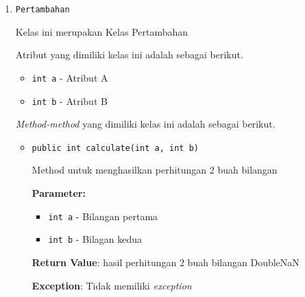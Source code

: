 \documentclass{article}
\begin{document}
\begin{enumerate}
\begin{itemize}
\end{itemize}
\item \texttt{Pertambahan}

Kelas ini merupakan Kelas Pertambahan

Atribut yang dimiliki kelas ini adalah sebagai berikut.
\begin{itemize}
\item \texttt{int a} - Atribut A
\item \texttt{int b} - Atribut B
\end{itemize}
\textit{Method-method} yang dimiliki kelas ini adalah sebagai berikut.
\begin{itemize}
\item \texttt{public int calculate(int a, int b)}

Method untuk menghasilkan perhitungan 2 buah bilangan

\textbf{Parameter:}
\begin{itemize}
\item \texttt{int a} - 
Bilangan pertama
\item \texttt{int b} - 
Bilagan kedua
\end{itemize}
\textbf{Return Value}: hasil perhitungan 2 buah bilangan  DoubleNaN

\textbf{Exception}: Tidak memiliki \textit{exception}

\end{itemize}
\end{enumerate}
\end{document}
